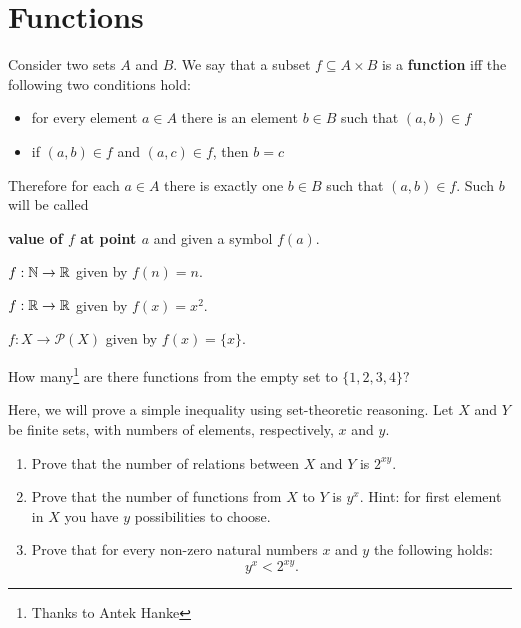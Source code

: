 \section{Functions}
\label{sec:intro_to_functions}

Consider two sets $A$ and $B$. We say that a subset $f\subseteq A\times B$ is a \textbf{function}
iff the following two conditions hold:
\begin{itemize}
	\item for every element $a\in A$ there is an element $b\in B$ such that $(a,b)\in f$
	\item if $(a,b)\in f$ and $(a,c)\in f$, then $b=c$
\end{itemize}

Therefore for each $a\in A$ there is exactly one $b\in B$ such that $(a,b)\in f$. Such $b$ will be called

\textbf{value of $f$ at point $a$} and given a symbol $f(a).$

\begin{example}
  $f: \mathbb N\to \mathbb R$ given by $f(n)=n$.
\end{example}

\begin{example}
  $f: \mathbb R\to \mathbb R$ given by $f(x)=x^2$.
\end{example}

\begin{example}
  $f: X\to \mathcal P(X)$ given by $f(x)=\{x\}$.
\end{example}

\begin{prob}
	How many\footnote{Thanks to Antek Hanke} are there functions from the empty set to $\{1,2,3,4\}?$
\end{prob}

\begin{exercise}
  Here, we will prove a simple inequality using set-theoretic reasoning. Let $X$ and $Y$ be finite sets, with numbers of elements, respectively, $x$ and $y$.
  \begin{enumerate}
    \item Prove that the number of relations between $X$ and $Y$ is $2^{xy}$.
    \item Prove that the number of functions from $X$ to $Y$ is $y^x$. Hint: for first element in $X$ you have $y$ possibilities to choose.
    \item Prove that for every non-zero natural numbers $x$ and $y$ the following holds:
      $$y^x<2^{xy}.$$
  \end{enumerate}
\end{exercise}


